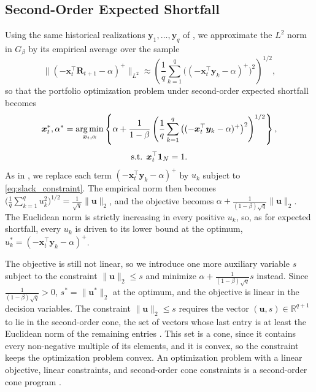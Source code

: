 \subsection{Second-Order Expected Shortfall} \label{app:socp_soes}

Using the same historical realizations $\bm{y}_1, \dots, \bm{y}_q$ of , we approximate the $L^2$ norm in $G_\beta$ by its
empirical average over the sample
\begin{equation*}
    \big\| (-\bm{x}_t^\top \bm{R}_{t+1} - \alpha)^+ \big\|_{L^2}
    \approx \left( \frac{1}{q} \sum_{k=1}^q \big( (-\bm{x}_t^\top \bm{y}_k - \alpha)^+ \big)^2 \right)^{1/2},
\end{equation*}
so that the portfolio optimization problem under second-order expected shortfall becomes
\begin{equation} \label{eq:empirical_soes}
\begin{gathered}
    \bm{x}_t^*, \alpha^* = \operatorname*{arg\,min}_{\bm{x}_t, \alpha} \left\{ \alpha
    + \frac{1}{1-\beta} \left( \frac{1}{q} \sum_{k=1}^q \big( (-\bm{x}_t^\top \bm{y}_k - \alpha)^+ \big)^2 \right)^{1/2}
    \right\}, \\[4pt]
    \text{s.t. } \bm{x}_t^\top \bm{1}_N = 1.
\end{gathered}
\end{equation}
As in , we replace each term $(-\bm{x}_t^\top \bm{y}_k - \alpha)^+$ by $u_k$ subject to
\eqref{eq:slack_constraint}. The empirical norm then becomes
$\big( \frac{1}{q} \sum_{k=1}^q u_k^2 \big)^{1/2} = \frac{1}{\sqrt{q}} \|\bm{u}\|_2$, and the objective becomes
$\alpha + \frac{1}{(1-\beta)\sqrt{q}} \|\bm{u}\|_2$. The Euclidean norm is strictly increasing in
every positive $u_k$, so, as for expected shortfall, every $u_k$ is driven to its lower bound at the optimum,
$u_k^* = (-\bm{x}_t^\top \bm{y}_k - \alpha)^+$.

The objective is still not linear, so we introduce one more auxiliary variable $s$ subject to the constraint
$\|\bm{u}\|_2 \le s$ and minimize $\alpha + \frac{1}{(1-\beta)\sqrt{q}} s$ instead. Since $\frac{1}{(1-\beta)\sqrt{q}} > 0$, $s^* = \|\bm{u}^*\|_2$ at the optimum, and the objective is linear in the decision variables. The constraint
$\|\bm{u}\|_2 \le s$ requires the vector $(\bm{u}, s) \in \mathbb{R}^{q+1}$ to lie in the second-order cone, the set of
vectors whose last entry is at least the Euclidean norm of the remaining entries \cite[Section~2.2.3]{boyd2004convex}.
This set is a cone, since it contains every non-negative multiple of its elements, and it is convex, so the constraint
keeps the optimization problem convex. An optimization problem with a linear objective, linear constraints, and
second-order cone constraints is a second-order cone program \cite[Section~4.4.2]{boyd2004convex}.

